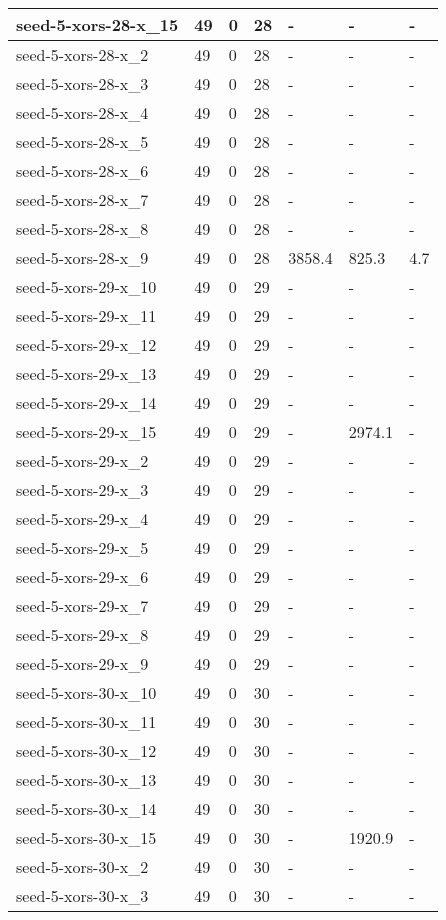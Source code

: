 \begin{scriptsize}
\begin{longtable}{|p{5cm}|l|l|l|l|l|l|}
seed-5-xors-28-x\_15&49&0&28&-&-&- \\ \hline 
seed-5-xors-28-x\_2&49&0&28&-&-&- \\ \hline 
seed-5-xors-28-x\_3&49&0&28&-&-&- \\ \hline 
seed-5-xors-28-x\_4&49&0&28&-&-&- \\ \hline 
seed-5-xors-28-x\_5&49&0&28&-&-&- \\ \hline 
seed-5-xors-28-x\_6&49&0&28&-&-&- \\ \hline 
seed-5-xors-28-x\_7&49&0&28&-&-&- \\ \hline 
seed-5-xors-28-x\_8&49&0&28&-&-&- \\ \hline 
seed-5-xors-28-x\_9&49&0&28&3858.4&825.3&4.7 \\ \hline 
seed-5-xors-29-x\_10&49&0&29&-&-&- \\ \hline 
seed-5-xors-29-x\_11&49&0&29&-&-&- \\ \hline 
seed-5-xors-29-x\_12&49&0&29&-&-&- \\ \hline 
seed-5-xors-29-x\_13&49&0&29&-&-&- \\ \hline 
seed-5-xors-29-x\_14&49&0&29&-&-&- \\ \hline 
seed-5-xors-29-x\_15&49&0&29&-&2974.1&- \\ \hline 
seed-5-xors-29-x\_2&49&0&29&-&-&- \\ \hline 
seed-5-xors-29-x\_3&49&0&29&-&-&- \\ \hline 
seed-5-xors-29-x\_4&49&0&29&-&-&- \\ \hline 
seed-5-xors-29-x\_5&49&0&29&-&-&- \\ \hline 
seed-5-xors-29-x\_6&49&0&29&-&-&- \\ \hline 
seed-5-xors-29-x\_7&49&0&29&-&-&- \\ \hline 
seed-5-xors-29-x\_8&49&0&29&-&-&- \\ \hline 
seed-5-xors-29-x\_9&49&0&29&-&-&- \\ \hline 
seed-5-xors-30-x\_10&49&0&30&-&-&- \\ \hline 
seed-5-xors-30-x\_11&49&0&30&-&-&- \\ \hline 
seed-5-xors-30-x\_12&49&0&30&-&-&- \\ \hline 
seed-5-xors-30-x\_13&49&0&30&-&-&- \\ \hline 
seed-5-xors-30-x\_14&49&0&30&-&-&- \\ \hline 
seed-5-xors-30-x\_15&49&0&30&-&1920.9&- \\ \hline 
seed-5-xors-30-x\_2&49&0&30&-&-&- \\ \hline 
seed-5-xors-30-x\_3&49&0&30&-&-&- \\ \hline 

\end{longtable}
\end{scriptsize}

